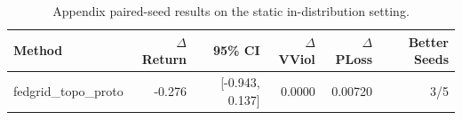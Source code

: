 \begin{table}[t]
\centering
\small
\begin{tabular}{lrrrrr}
\hline
Method & $\Delta$Return & 95\% CI & $\Delta$VViol & $\Delta$PLoss & Better Seeds \\
\hline
[case=141, k=6, policy=, radius=] fedgrid\_topo\_proto & -0.276 & [-0.943, 0.137] & 0.0000 & 0.00720 & 3/5 \\
\hline
\end{tabular}
\caption{Appendix paired-seed results on the static in-distribution setting.}
\label{tab:fedgrid-appendix-static}
\end{table}

